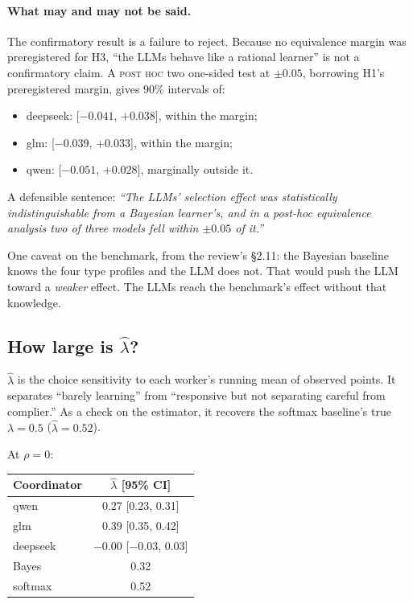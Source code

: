 \documentclass[11pt,a4paper]{article}
\newcommand{\posthoc}{\textsc{post hoc}}
\begin{document}
\paragraph{What may and may not be said.} The confirmatory result is a failure to reject. Because no equivalence margin was preregistered for H3, ``the LLMs behave like a rational learner'' is not a confirmatory claim. A \posthoc{} two one-sided test at $\pm0.05$, borrowing H1's preregistered margin, gives 90\% intervals of:
\begin{itemize}
  \item deepseek: [$-0.041$, $+0.038$], within the margin;
  \item glm: [$-0.039$, $+0.033$], within the margin;
  \item qwen: [$-0.051$, $+0.028$], marginally outside it.
\end{itemize}
A defensible sentence: \emph{``The LLMs' selection effect was statistically indistinguishable from a Bayesian learner's, and in a post-hoc equivalence analysis two of three models fell within $\pm0.05$ of it.''}

One caveat on the benchmark, from the review's \S2.11: the Bayesian baseline knows the four type profiles and the LLM does not. That would push the LLM toward a \emph{weaker} effect. The LLMs reach the benchmark's effect without that knowledge.

\subsection{How large is $\hat\lambda$?}

$\hat\lambda$ is the choice sensitivity to each worker's running mean of observed points. It separates ``barely learning'' from ``responsive but not separating careful from complier.'' As a check on the estimator, it recovers the softmax baseline's true $\lambda=0.5$ ($\hat\lambda=0.52$).

At $\rho=0$:

\begin{center}
\small
\begin{tabular}{lc}
\toprule
Coordinator & $\hat\lambda$ [95\% CI] \\
\midrule
qwen & 0.27 [0.23, 0.31] \\
glm & 0.39 [0.35, 0.42] \\
deepseek & $-0.00$ [$-0.03$, $0.03$] \\
Bayes & 0.32 \\
softmax & 0.52 \\
\bottomrule
\end{tabular}
\end{center}
\end{document}
